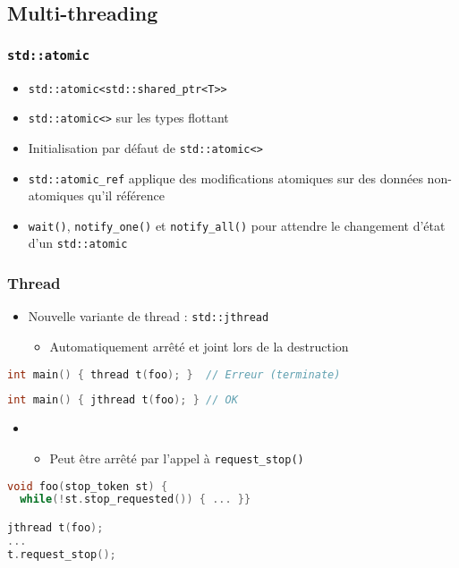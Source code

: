 \documentclass[C++.tex]{subfiles}
\begin{document}
\subsection*{Multi-threading}
\begin{frame}[fragile]
	\frametitle{\lstinline|std::atomic|}
	\begin{itemize}
		\item \lstinline|std::atomic<std::shared_ptr<T>>|
		\item \lstinline|std::atomic<>| sur les types flottant
		\item Initialisation par défaut de \lstinline|std::atomic<>|
		\item \lstinline|std::atomic_ref| applique des modifications atomiques sur des données non-atomiques qu'il référence
		\item \lstinline|wait()|, \lstinline|notify_one()| et \lstinline|notify_all()| pour attendre le changement d'état d'un \lstinline|std::atomic|
	\end{itemize}
\end{frame}

\begin{frame}[fragile]
	\frametitle{Thread}
	\begin{itemize}
		\item Nouvelle variante de thread : \lstinline|std::jthread|
		\begin{itemize}
			\item Automatiquement arrêté et joint lors de la destruction
		\end{itemize}
	\end{itemize}


	\begin{lstlisting}[language=C++]
int main() { thread t(foo); }  // Erreur (terminate)\end{lstlisting}


	\begin{lstlisting}[language=C++]
int main() { jthread t(foo); } // OK\end{lstlisting}

	\begin{itemize}
		\item [] \begin{itemize}
			\item Peut être arrêté par l'appel à \lstinline|request_stop()|
		\end{itemize}
	\end{itemize}

	\begin{lstlisting}[language=C++]
void foo(stop_token st) {
  while(!st.stop_requested()) { ... }}

jthread t(foo);
...
t.request_stop();\end{lstlisting}
\end{frame}
\end{document}
